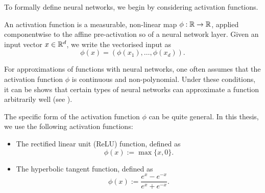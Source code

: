 To formally define neural networks, we begin by considering activation functions.
\begin{definition}
\label{def: Activation function}
    An activation function is a measurable, non-linear map $\phi: \mathbb{R} \rightarrow \mathbb{R}$, applied componentwise to the affine pre-activation so of a neural network layer. Given an input vector $x \in \mathbb{R}^d$, we write the vectorised input as
    \begin{equation*}
        \phi(x) = (\phi(x_1), \ldots, \phi(x_d)).
    \end{equation*}
\end{definition}
\begin{remark}
    For approximations of functions with neural networks, one often assumes that the activation function $\phi$ is continuous and non-polynomial. Under these conditions, it can be shows that certain types of neural networks can approximate a function arbitrarily well (see \cite{leshno1993multilayer}). 
\end{remark}
The specific form of the activation function $\phi$ can be quite general. In this thesis, we use the following activation functions:
\begin{itemize}
    \item The rectified linear unit (ReLU) function, defined as
    \begin{equation}
        \phi(x) := \max\{x,0\}.
        \label{eqn: ReLU activation}
    \end{equation}
    \item The hyperbolic tangent function, defined as 
    \begin{equation}
        \phi(x) := \frac{e^x-e^{-x}}{e^x+e^{-x}}.
        \label{eqn: Tanh activation}
    \end{equation}
\end{itemize}

